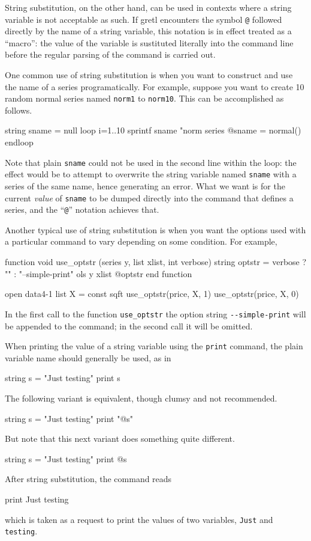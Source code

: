 String substitution, on the other hand, can be used in contexts where
a string variable is not acceptable as such. If gretl encounters
the symbol \verb|@| followed directly by the name of a string
variable, this notation is in effect treated as a ``macro'': the value
of the variable is sustituted literally into the command line before
the regular parsing of the command is carried out.

One common use of string substitution is when you want to construct
and use the name of a series programatically. For example, suppose you
want to create 10 random normal series named \texttt{norm1} to
\texttt{norm10}. This can be accomplished as follows.
%
\begin{code}
string sname = null
loop i=1..10
  sprintf sname "norm%
  series @sname = normal()
endloop
\end{code}
%
Note that plain \texttt{sname} could not be used in the second line
within the loop: the effect would be to attempt to overwrite the
string variable named \texttt{sname} with a series of the same name,
hence generating an error. What we want is for the current
\textit{value} of \texttt{sname} to be dumped directly into the
command that defines a series, and the ``\verb|@|'' notation achieves
that.

Another typical use of string substitution is when you want the
options used with a particular command to vary depending on
some condition. For example,
%
\begin{code}
function void use_optstr (series y, list xlist, int verbose)
   string optstr = verbose ? "" : "--simple-print"
   ols y xlist @optstr 
end function

open data4-1
list X = const sqft
use_optstr(price, X, 1)
use_optstr(price, X, 0)
\end{code}

In the first call to the function \texttt{use\_optstr} the option
string \verb|--simple-print| will be appended to the 
command; in the second call it will be omitted.

When printing the value of a string variable using the \texttt{print}
command, the plain variable name should generally be used, as in
%
\begin{code}
string s = "Just testing"
print s
\end{code}
%
The following variant is equivalent, though clumsy and not
recommended.
%
\begin{code}
string s = "Just testing"
print "@s"
\end{code}
%
But note that this next variant does something quite different.
%
\begin{code}
string s = "Just testing"
print @s
\end{code}
%
After string substitution, the command reads
%
\begin{code}
print Just testing
\end{code}
%
which is taken as a request to print the values of two variables,
\texttt{Just} and \texttt{testing}.

